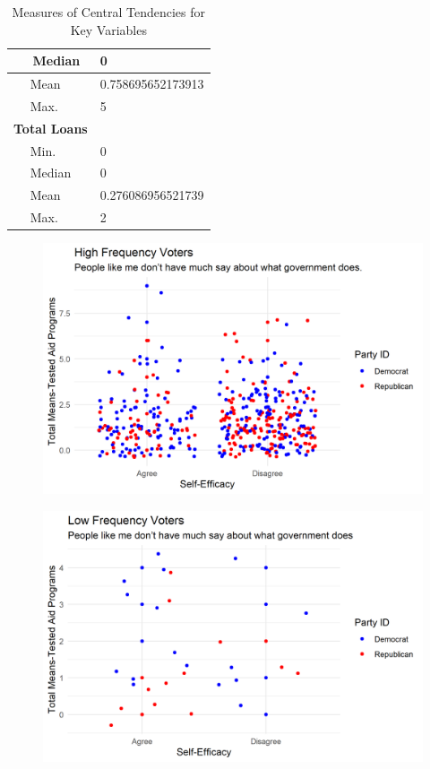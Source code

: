 \documentclass[12pt]{paper}
\begin{document}
\begin{table}
\begin{tabular}{l|l}
	\hline
	~~ Median & 0\\
	\hline
	~~ Mean & 0.758695652173913\\
	\hline
	~~ Max. & 5\\
	\hline
	\bf{Total Loans} & ~\\
	\hline
	~~ Min. & 0\\
	\hline
	~~ Median & 0\\
	\hline
	~~ Mean & 0.276086956521739\\
	\hline
	~~ Max. & 2\\
	\hline
\end{tabular}
\caption{Measures of Central Tendencies for Key Variables}
\label{Appendix C.1}
\end{table}

\begin{figure}[H]
	\includegraphics[scale=0.7]{Figs/scatter_means_efficacy_high.png} \centering
	\caption{}
	\label{}
\end{figure}


\begin{figure}[H]
	\includegraphics[scale=0.7]{Figs/scatter_means_efficacy_low.png} \centering
	\caption{}
	\label{}
\end{figure}
\end{document}
